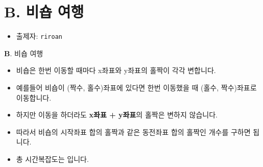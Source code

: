 \section{B. 비숍 여행}

\begin{frame} %
    \begin{itemize}
        \item 출제자: \texttt{riroan}
    \end{itemize}
\end{frame}

\begin{frame}{\textbf{B}. 비숍 여행}
    \begin{itemize}
    	\item 비숍은 한번 이동할 때마다 x좌표와 y좌표의 홀짝이 각각 변합니다.
    	\item 예를들어 비숍이 (짝수, 홀수)좌표에 있다면 한번 이동했을 때 (홀수, 짝수)좌표로 이동합니다.
    	\item 하지만 이동을 하더라도 \textbf{x좌표 + y좌표}의 홀짝은 변하지 않습니다.
    	\item 따라서 비숍의 시작좌표 합의 홀짝과 같은 동전좌표 합의 홀짝인 개수를 구하면 됩니다.
    	\item 총 시간복잡도는 입니다.
    \end{itemize}
\end{frame}